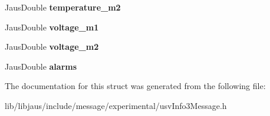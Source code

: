 \begin{DoxyCompactItemize}
\item 
\hypertarget{struct_u_s_v_info3_message_struct_add1fd694e79a3b1b89a6ae8fb1ee0e92}{\-Jaus\-Double {\bfseries temperature\-\_\-m2}}\label{struct_u_s_v_info3_message_struct_add1fd694e79a3b1b89a6ae8fb1ee0e92}

\item 
\hypertarget{struct_u_s_v_info3_message_struct_af246afb42939eba9f6d0b12e07df45d0}{\-Jaus\-Double {\bfseries voltage\-\_\-m1}}\label{struct_u_s_v_info3_message_struct_af246afb42939eba9f6d0b12e07df45d0}

\item 
\hypertarget{struct_u_s_v_info3_message_struct_ab20b0343e7dc83c8bf5e2e3e874ac2c0}{\-Jaus\-Double {\bfseries voltage\-\_\-m2}}\label{struct_u_s_v_info3_message_struct_ab20b0343e7dc83c8bf5e2e3e874ac2c0}

\item 
\hypertarget{struct_u_s_v_info3_message_struct_aeebef4ab3b25c919e884acb6723d412a}{\-Jaus\-Double {\bfseries alarms}}\label{struct_u_s_v_info3_message_struct_aeebef4ab3b25c919e884acb6723d412a}

\end{DoxyCompactItemize}


\-The documentation for this struct was generated from the following file\-:\begin{DoxyCompactItemize}
\item 
lib/libjaus/include/message/experimental/usv\-Info3\-Message.\-h\end{DoxyCompactItemize}
